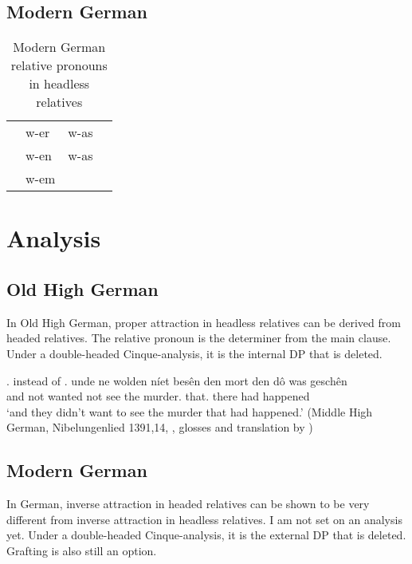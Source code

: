 \subsection{Modern German}

\begin{table}[h]\label{tbl:paradigmg}
	\center
	\caption {Modern German relative pronouns in headless relatives}
	\begin{minipage}{0.4\linewidth}
		\begin{tabularx}{\textwidth}{c *{3}{Y}}
		\toprule
			&  &   \\
		\midrule
      & w-er   	& w-as     \\
      & w-en   	& w-as     \\
      & w-em   	&  		     \\
		\bottomrule
		\end{tabularx}
	\end{minipage}
\end{table}

  \section{Analysis}

    \subsection{Old High German}
In Old High German, proper attraction in headless relatives can be derived from headed relatives. The relative pronoun is the determiner from the main clause. Under a double-headed Cinque-analysis, it is the internal DP that is deleted.




\ex.  instead of 
\ag. unde ne wolden níet besên den mort den dô was geschên\\
 and not wanted not see the murder. that. there had happened\\
 `and they didn't want to see the murder that had happened.' \hfill (Middle High German, Nibelungenlied 1391,14, \citealt[756]{behaghel1923}, glosses and translation by \citealt[198]{pittner1995})



    \subsection{Modern German}
In German, inverse attraction in headed relatives can be shown to be very different from inverse attraction in headless relatives. I am not set on an analysis yet. Under a double-headed Cinque-analysis, it is the external DP that is deleted. Grafting is also still an option.


